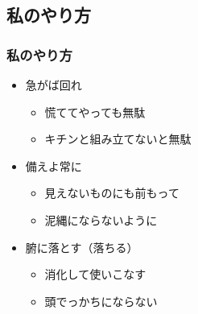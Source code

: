 \documentclass[12pt, dvipdfmx]{beamer}
\begin{document}
\subsection{私のやり方}
\begin{frame}
    \frametitle{私のやり方}
        \begin{itemize}
            \LARGE
            \item 急がば回れ
            \begin{itemize}
                \Large
                \item<2-> 慌ててやっても無駄
                \item<2-> キチンと組み立てないと無駄
            \end{itemize}
            \item 備えよ常に
            \begin{itemize}
                \Large
                \item<3-> 見えないものにも前もって
                \item<3-> 泥縄にならないように
            \end{itemize}
            \item 腑に落とす（落ちる）
            \begin{itemize}
                \Large
                \item<4> 消化して使いこなす
                \item<4> 頭でっかちにならない
            \end{itemize}
        \end{itemize}
\end{frame}

            
\end{document}
